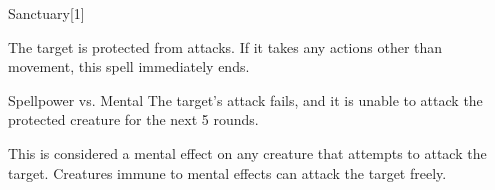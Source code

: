 
\begin{spellsection}{Sanctuary}[1]
    \begin{spellheader}
    \end{spellheader}
    \begin{spellcontent}
        \begin{spelltargetinginfo}
        \end{spelltargetinginfo}
        \begin{spelleffects}
            \spelleffect The target is protected from attacks. If it takes any actions other than movement, this spell immediately ends.
            \spelldur \durshort
        \end{spelleffects}
    \end{spellcontent}
    \begin{spellsubcontent}
        \begin{spelltargetinginfo}
        \end{spelltargetinginfo}
        \begin{spelleffects}
            \begin{spellattack}{Spellpower vs. Mental}
                \spellsuccess The target's attack fails, and it is unable to attack the protected creature for the next 5 rounds.
            \end{spellattack}
        \end{spelleffects}
    \end{spellsubcontent}
    \begin{spellfooter}
        \spellnotes This is considered a mental effect on any creature that attempts to attack the target. Creatures immune to mental effects can attack the target freely.
        \miscastexplode
    \end{spellfooter}
    \begin{spellaugments}
    \end{spellaugments}
\end{spellsection}

